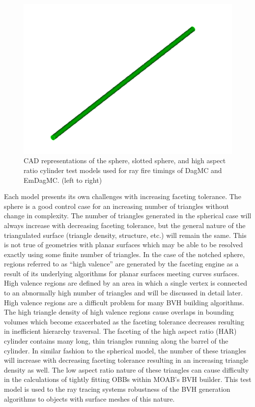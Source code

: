 \documentclass[10pt, a4paper]{article}
\begin{document}
\begin{figure}
\begin{center}
    \includegraphics[scale=0.1]{larcyl.png}
    \caption{CAD representations of the sphere, slotted sphere, and high aspect ratio cylinder test models used for ray fire timings of DagMC and EmDagMC. (left to right) \label{models}}

  \end{center}
\vspace{-0.3cm}

\end{figure} 


Each model presents its own challenges with increasing faceting tolerance. The sphere is a good control case for an increasing number of triangles without change in complexity. The number of triangles generated in the spherical case will always increase with decreasing faceting tolerance, but the general nature of the triangulated surface (triangle density, structure, etc.) will remain the same. This is not true of geometries with planar surfaces which may be able to be resolved exactly using some finite number of triangles. In the case of the notched sphere, regions referred to as ``high valence'' are generated by the faceting engine as a result of its underlying algorithms for planar surfaces meeting curves surfaces. High valence regions are defined by an area in which a single vertex is connected to an abnormally high number of triangles and will be discussed in detail later. High valence regions are a difficult problem for many BVH building algorithms. The high triangle density of high valence regions cause overlaps in bounding volumes which become exacerbated as the faceting tolerance decreases resulting in inefficient hierarchy traversal. The faceting of the high aspect ratio (HAR) cylinder contains many long, thin triangles running along the barrel of the cylinder. In similar fashion to the spherical model, the number of these triangles will increase with decreasing faceting tolerance resulting in an increasing triangle density as well. The low aspect ratio nature of these triangles can cause difficulty in the calculations of tightly fitting OBBs within MOAB's BVH builder. This test model is used to the ray tracing systems robustness of the BVH generation algorithms to objects with surface meshes of this nature.
\end{document}
